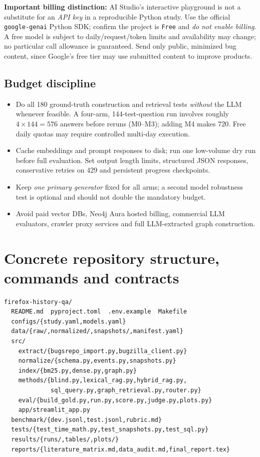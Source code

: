 \documentclass[11pt,a4paper]{article}
\begin{document}
\textbf{Important billing distinction:} AI Studio's interactive playground is not a substitute for an \emph{API key} in a reproducible Python study. Use the official \texttt{google-genai} Python SDK\cite{geministart}; confirm the project is \texttt{Free} and \emph{do not enable billing}. A free model is subject to daily/request/token limits and availability may change; no particular call allowance is guaranteed. Send only public, minimized bug content, since Google's free tier may use submitted content to improve products\cite{geminipricing}.

\subsection{Budget discipline}
\begin{itemize}
\item Do all 180 ground-truth construction and retrieval tests \emph{without} the LLM whenever feasible. A four-arm, 144-test-question run involves roughly $4\times144=576$ answers before reruns (M0--M3); adding M4 makes 720. Free daily quotas may require controlled multi-day execution.
\item Cache embeddings and prompt responses to disk; run one low-volume dry run before full evaluation. Set output length limits, structured JSON responses, conservative retries on 429 and persistent progress checkpoints.
\item Keep \emph{one primary generator} fixed for all arms; a second model robustness test is optional and should not double the mandatory budget.
\item Avoid paid vector DBs, Neo4j Aura hosted billing, commercial LLM evaluators, crawler proxy services and full LLM-extracted graph construction.
\end{itemize}

\section{Concrete repository structure, commands and contracts}
\begin{lstlisting}
firefox-history-qa/
  README.md  pyproject.toml  .env.example  Makefile
  configs/{study.yaml,models.yaml}
  data/{raw/,normalized/,snapshots/,manifest.yaml}
  src/
    extract/{bugsrepo_import.py,bugzilla_client.py}
    normalize/{schema.py,events.py,snapshots.py}
    index/{bm25.py,dense.py,graph.py}
    methods/{blind.py,lexical_rag.py,hybrid_rag.py,
             sql_query.py,graph_retrieval.py,router.py}
    eval/{build_gold.py,run.py,score.py,judge.py,plots.py}
    app/streamlit_app.py
  benchmark/{dev.jsonl,test.jsonl,rubric.md}
  tests/{test_time_math.py,test_snapshots.py,test_sql.py}
  results/{runs/,tables/,plots/}
  reports/{literature_matrix.md,data_audit.md,final_report.tex}
\end{lstlisting}
\end{document}
